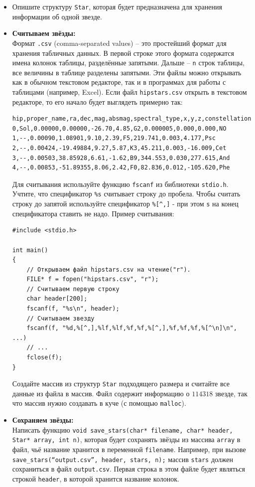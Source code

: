 \documentclass{article}
\begin{document}
\begin{itemize}
\item Опишите структуру \texttt{Star}, которая будет предназначена для хранения информации об одной звезде.
\item \textbf{Считываем звёзды:}\\ 
Формат \texttt{.csv} (comma-separated values) -- это простейший формат для хранения табличных данных. В первой строке этого формата содержатся имена колонок таблицы, разделённые запятыми. Дальше -- \texttt{n} строк таблицы, все величины в таблице разделены запятыми. Эти файлы можно открывать как в обычном текстовом редакторе, так и в программах для работы с таблицами (например, Excel). Если файл \texttt{hipstars.csv} открыть в текстовом редакторе, то его начало будет выглядеть примерно так:
\begin{verbatim}
hip,proper_name,ra,dec,mag,absmag,spectral_type,x,y,z,constellation
0,Sol,0.00000,0.00000,-26.70,4.85,G2,0.000005,0.000,0.000,NO
1,--,0.00090,1.08901,9.10,2.39,F5,219.741,0.003,4.177,Psc
2,--,0.00424,-19.49884,9.27,5.87,K3,45.211,0.003,-16.009,Cet
3,--,0.00503,38.85928,6.61,-1.62,B9,344.553,0.030,277.615,And
4,--,0.00853,-51.89355,8.06,2.42,F0,82.836,0.012,-105.620,Phe
\end{verbatim}
Для считывания используйте функцию \texttt{fscanf} из библиотеки \texttt{stdio.h}. Учтите, что спецификатор \texttt{\%s} считывает строку до пробела. Чтобы считать строку до запятой используйте спецификатор \texttt{\%[\textasciicircum,]} - при этом \texttt{s} на конец спецификатора ставить не надо. Пример считывания:
\begin{lstlisting}
#include <stdio.h>

int main()
{
    // Открываем файл hipstars.csv на чтение("r").
    FILE* f = fopen("hipstars.csv", "r");
    // Считываем первую строку
    char header[200];
    fscanf(f, "%s\n", header);
    // Считываем звезду
    fscanf(f, "%d,%[^,],%lf,%lf,%f,%f,%[^,],%f,%f,%f,%[^\n]\n", ...)
    // ...
    fclose(f);
}
\end{lstlisting}

Создайте массив из структур \texttt{Star} подходящего размера и считайте все данные из файла в массив. Файл содержит информацию о $114318$ звезде, так что массив нужно создавать в куче (с помощью \texttt{malloc}). \\

\item \textbf{Сохраняем звёзды:}\\ Написать функцию \texttt{void save\_stars(char* filename, char* header, Star* array, int n)}, которая будет сохранять звёзды из массива \texttt{array} в файл, чьё название хранится в переменной \texttt{filename}. Например, при вызове \texttt{save\_stars(``output.csv'', header, stars, n);} массив \texttt{stars} должен сохраниться в файл \texttt{output.csv}. Первая строка в этом файле будет являться строкой \texttt{header}, в которой хранится название колонок.


\end{itemize}
\end{document}
